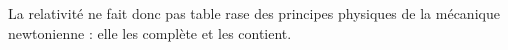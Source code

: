 La relativité ne fait donc pas table rase des principes physiques de la mécanique newtonienne : elle les complète et les contient.



